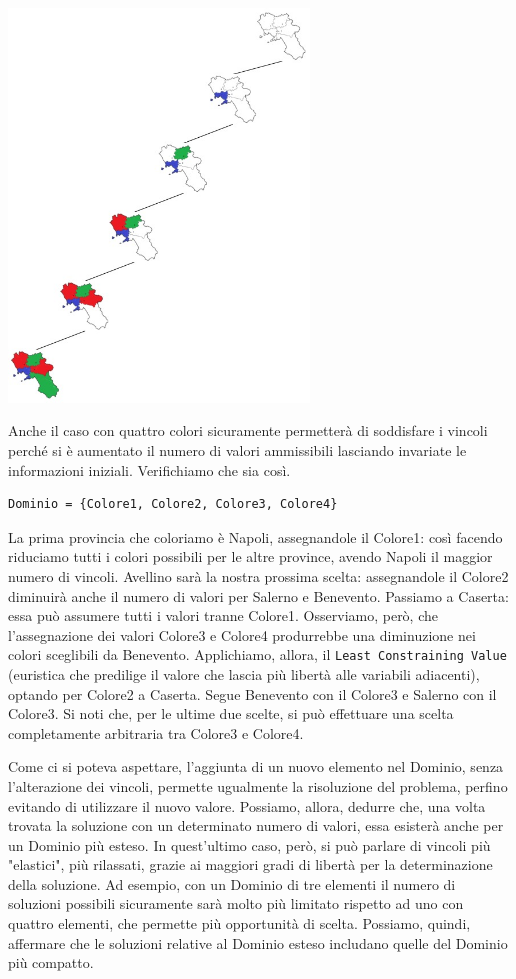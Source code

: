		\begin{center}
			\includegraphics[width=0.6\textwidth, height=0.4\textheight]{SearchTree.jpg}
		\end{center}\par
		Anche il caso con quattro colori sicuramente permetterà di soddisfare i vincoli perché si è aumentato il numero di valori ammissibili lasciando invariate le informazioni iniziali. Verifichiamo che sia così.
		\begin{lstlisting}
Dominio = {Colore1, Colore2, Colore3, Colore4}
		\end{lstlisting}
		La prima provincia che coloriamo è Napoli, assegnandole il Colore1: così facendo riduciamo tutti i colori possibili per le altre province, avendo Napoli il maggior numero di vincoli. Avellino sarà la nostra prossima scelta: assegnandole il Colore2 diminuirà anche il numero di valori per Salerno e Benevento. Passiamo a Caserta: essa può assumere tutti i valori tranne Colore1. Osserviamo, però, che l'assegnazione dei valori Colore3 e Colore4 produrrebbe una diminuzione nei colori sceglibili da Benevento. Applichiamo, allora, il \texttt{Least Constraining Value} (euristica che predilige il valore che lascia più libertà alle variabili adiacenti), optando per Colore2 a Caserta. Segue Benevento con il Colore3 e Salerno con il Colore3. Si noti che, per le ultime due scelte, si può effettuare una scelta completamente arbitraria tra Colore3 e Colore4.\par
		Come ci si poteva aspettare, l'aggiunta di un nuovo elemento nel Dominio, senza l'alterazione dei vincoli, permette ugualmente la risoluzione del problema, perfino evitando di utilizzare il nuovo valore. Possiamo, allora, dedurre che, una volta trovata la soluzione con un determinato numero di valori, essa esisterà anche per un Dominio più esteso. In quest'ultimo caso, però, si può parlare di vincoli più "elastici", più rilassati, grazie ai maggiori gradi di libertà per la determinazione della soluzione. Ad esempio, con un Dominio di tre elementi il numero di soluzioni possibili sicuramente sarà molto più limitato rispetto ad uno con quattro elementi, che permette più opportunità di scelta. Possiamo, quindi, affermare che le soluzioni relative al Dominio esteso includano quelle del Dominio più compatto. 
